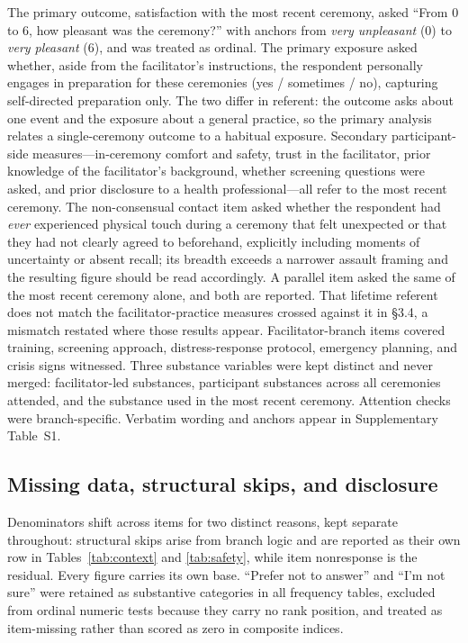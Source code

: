 \documentclass[12pt]{article}
\begin{document}
The primary outcome, satisfaction with the most recent ceremony, asked ``From 0 to 6, how pleasant was the
ceremony?'' with anchors from \emph{very unpleasant} (0) to \emph{very pleasant} (6), and was treated as
ordinal. The primary exposure asked whether, aside from the facilitator's instructions, the respondent
personally engages in preparation for these ceremonies (yes / sometimes / no), capturing self-directed
preparation only. The two differ in referent: the outcome asks about one event and the exposure about a
general practice, so the primary analysis relates a single-ceremony outcome to a habitual exposure.
Secondary participant-side measures---in-ceremony comfort and safety, trust in the facilitator, prior
knowledge of the facilitator's background, whether screening questions were asked, and prior disclosure to
a health professional---all refer to the most recent ceremony. The non-consensual contact item asked
whether the respondent had \emph{ever} experienced physical touch during a ceremony that felt unexpected or
that they had not clearly agreed to beforehand, explicitly including moments of uncertainty or absent
recall; its breadth exceeds a narrower assault framing and the resulting figure should be read accordingly.
A parallel item asked the same of the most recent ceremony alone, and both are reported. That lifetime
referent does not match the facilitator-practice measures crossed against it in \S3.4, a mismatch restated
where those results appear. Facilitator-branch items covered training, screening approach,
distress-response protocol, emergency planning, and crisis signs witnessed. Three substance variables were
kept distinct and never merged: facilitator-led substances, participant substances across all ceremonies
attended, and the substance used in the most recent ceremony. Attention checks were branch-specific.
Verbatim wording and anchors appear in Supplementary Table~S1.

\subsection{Missing data, structural skips, and disclosure}

Denominators shift across items for two distinct reasons, kept separate throughout: structural skips arise
from branch logic and are reported as their own row in Tables~\ref{tab:context} and \ref{tab:safety}, while
item nonresponse is the residual. Every figure carries its own base. ``Prefer not to answer'' and ``I'm not
sure'' were retained as substantive categories in all frequency tables, excluded from ordinal numeric tests
because they carry no rank position, and treated as item-missing rather than scored as zero in composite
indices.
\end{document}

